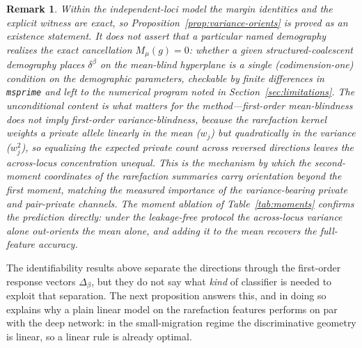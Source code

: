 \documentclass[11pt]{article}
\theoremstyle{plain}
\newtheorem{rem}[thm]{Remark}
\theoremstyle{definition}
\theoremstyle{remark}
\begin{document}
\begin{rem}
Within the independent-loci model the margin identities and the explicit witness are exact, so
Proposition~\ref{prop:variance-orients} is proved as an existence statement. It does \emph{not}
assert that a particular named demography realizes the exact cancellation $M_\mu(g)=0$: whether a
given structured-coalescent demography places $\delta^\beta$ on the mean-blind hyperplane is a
single (codimension-one) condition on the demographic parameters, checkable by finite differences
in \texttt{msprime} and left to the numerical program noted in Section~\ref{sec:limitations}. The
unconditional content is what matters for the method---first-order mean-blindness does not imply
first-order variance-blindness, because the rarefaction kernel weights a private allele
\emph{linearly} in the mean ($w_j$) but \emph{quadratically} in the variance ($w_j^2$), so
equalizing the expected private count across reversed directions leaves the across-locus
concentration unequal. This is the mechanism by which the second-moment coordinates of the rarefaction summaries
carry orientation beyond the first moment, matching the measured importance of the
variance-bearing private and pair-private channels. The moment ablation of
Table~\ref{tab:moments} confirms the prediction directly: under the leakage-free protocol the
across-locus variance alone out-orients the mean alone, and adding it to the mean recovers the
full-feature accuracy.
\end{rem}

The identifiability results above separate the directions through the first-order response
vectors $\Delta_\beta$, but they do not say what \emph{kind} of classifier is needed to exploit
that separation. The next proposition answers this, and in doing so explains why a plain linear
model on the rarefaction features performs on par with the deep network: in the small-migration
regime the discriminative geometry is linear, so a linear rule is already optimal.
\end{document}
